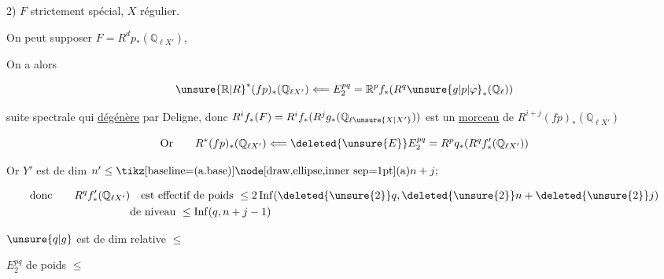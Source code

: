 
2) $F$  strictement spécial, $X$ régulier.

On peut supposer $F=R^dp_*(\mathbb Q_{\ell X'})$, 


On a alors

\[ \unsure{\mathbb R|R}^*(fp)_*(\mathbb Q_{\ell X'})\Longleftarrow E_2^{pq}=\mathbb R^p f_*(R^q\unsure{g|p|\varphi}_*(\mathbb Q_\ell)) \]

suite spectrale qui \uline{dégénère} par Deligne, donc $R^if_*(F)=R^if_*(R^j g_*(\mathbb Q_{\ell\unsure{X|X'}}))$ est un \uline{morceau} de $R^{i+j}(fp)_*(\mathbb Q_{\ell X'})$

\[ \text{Or}\qquad R^*(fp)_*(\mathbb Q_{\ell X'})\Longleftarrow \deleted{\unsure{E}}E_2^{pq}=R^p q_*(R^q f'_*(\mathbb Q_{\ell X'})) \]

Or $Y'$ est de dim  $n'\leq\text{\tikz[baseline=(a.base)]\node[draw,ellipse,inner sep=1pt](a){$n+j$};}$

\[
\begin{aligned}
\text{donc}\qquad R^q f'_*(\mathbb Q_{\ell X'})&\quad\text{est effectif de poids }\leq 2\operatorname{Inf}(\deleted{\unsure{2}}q,\deleted{\unsure{2}}n+\deleted{\unsure{2}}j)\\
&\text{de niveau }\leq\operatorname{Inf}(q,n+j-1)
\end{aligned}
\]

$\unsure{q|g}$ est de dim relative $\leq$


 $E_2^{pq}$ de poids $\leq$

